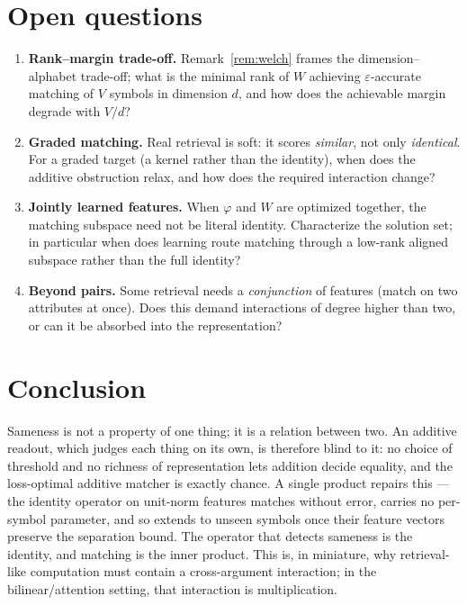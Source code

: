 \documentclass[11pt]{article}
\theoremstyle{plain}
\theoremstyle{definition}
\theoremstyle{remark}
\begin{document}
\section{Open questions}
\label{sec:open}

\begin{enumerate}
\item \textbf{Rank--margin trade-off.} Remark~\ref{rem:welch} frames the dimension--alphabet trade-off; what is the minimal rank of $W$ achieving $\varepsilon$-accurate matching of $V$ symbols in dimension $d$, and how does the achievable margin degrade with $V/d$?
\item \textbf{Graded matching.} Real retrieval is soft: it scores \emph{similar}, not only \emph{identical}. For a graded target (a kernel rather than the identity), when does the additive obstruction relax, and how does the required interaction change?
\item \textbf{Jointly learned features.} When $\varphi$ and $W$ are optimized together, the matching subspace need not be literal identity. Characterize the solution set; in particular when does learning route matching through a low-rank aligned subspace rather than the full identity?
\item \textbf{Beyond pairs.} Some retrieval needs a \emph{conjunction} of features (match on two attributes at once). Does this demand interactions of degree higher than two, or can it be absorbed into the representation?
\end{enumerate}

\section{Conclusion}
\label{sec:conclusion}

Sameness is not a property of one thing; it is a relation between two. An additive readout, which judges each thing on its own, is therefore blind to it: no choice of threshold and no richness of representation lets addition decide equality, and the loss-optimal additive matcher is exactly chance. A single product repairs this --- the identity operator on unit-norm features matches without error, carries no per-symbol parameter, and so extends to unseen symbols once their feature vectors preserve the separation bound. The operator that detects sameness is the identity, and matching is the inner product. This is, in miniature, why retrieval-like computation must contain a cross-argument interaction; in the bilinear/attention setting, that interaction is multiplication.
\end{document}
